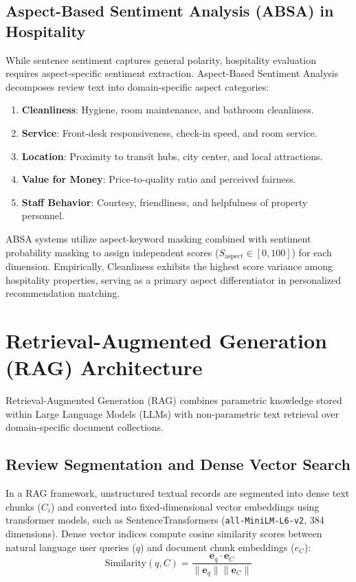 \subsection{Aspect-Based Sentiment Analysis (ABSA) in Hospitality}
While sentence sentiment captures general polarity, hospitality evaluation requires aspect-specific sentiment extraction. Aspect-Based Sentiment Analysis decomposes review text into domain-specific aspect categories:
\begin{enumerate}
    \item \textbf{Cleanliness}: Hygiene, room maintenance, and bathroom cleanliness.
    \item \textbf{Service}: Front-desk responsiveness, check-in speed, and room service.
    \item \textbf{Location}: Proximity to transit hubs, city center, and local attractions.
    \item \textbf{Value for Money}: Price-to-quality ratio and perceived fairness.
    \item \textbf{Staff Behavior}: Courtesy, friendliness, and helpfulness of property personnel.
\end{enumerate}

ABSA systems utilize aspect-keyword masking combined with sentiment probability masking to assign independent scores ($S_{\text{aspect}} \in [0, 100]$) for each dimension. Empirically, Cleanliness exhibits the highest score variance among hospitality properties, serving as a primary aspect differentiator in personalized recommendation matching.

\section{Retrieval-Augmented Generation (RAG) Architecture}
Retrieval-Augmented Generation (RAG) combines parametric knowledge stored within Large Language Models (LLMs) with non-parametric text retrieval over domain-specific document collections.

\subsection{Review Segmentation and Dense Vector Search}
In a RAG framework, unstructured textual records are segmented into dense text chunks ($C_i$) and converted into fixed-dimensional vector embeddings using transformer models, such as SentenceTransformers (\texttt{all-MiniLM-L6-v2}, 384 dimensions). Dense vector indices compute cosine similarity scores between natural language user queries ($q$) and document chunk embeddings ($e_C$):
\begin{equation}
\text{Similarity}(q, C) = \frac{\mathbf{e}_q \cdot \mathbf{e}_C}{\|\mathbf{e}_q\| \|\mathbf{e}_C\|}
\end{equation}

